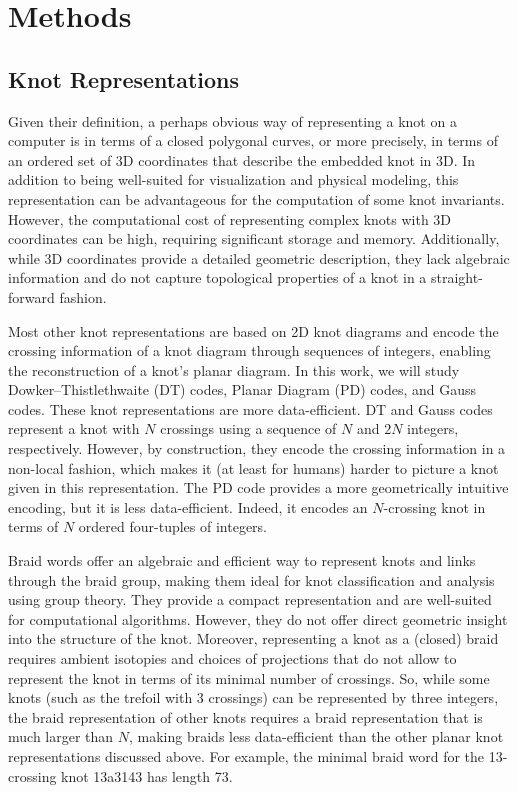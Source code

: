 \documentclass[11pt]{article}
\numberwithin{equation}{section}
\begin{document}
\section{Methods}
\label{sec:Methods}

\subsection{Knot Representations}
\label{sec:Representations}
Given their definition, a perhaps obvious way of representing a knot on a computer is in terms of a closed polygonal curves, or more precisely, in terms of an ordered set of 3D coordinates that describe the embedded knot in 3D. In addition to being well-suited for visualization and physical modeling, this representation can be advantageous for the computation of some knot invariants. However, the computational cost of representing complex knots with 3D coordinates can be high, requiring significant storage and memory. Additionally, while 3D coordinates provide a detailed geometric description, they lack algebraic information and do not capture topological properties of a knot in a straight-forward fashion.

Most other knot representations are based on 2D knot diagrams and encode the crossing information of a knot diagram through sequences of integers, enabling the reconstruction of a knot's planar diagram. In this work, we will study Dowker–Thistlethwaite (DT) codes, Planar Diagram (PD) codes, and Gauss codes. These knot representations are more data-efficient. DT and Gauss codes represent a knot with $N$ crossings using a sequence of $N$ and $2N$ integers, respectively. However, by construction, they encode the crossing information in a non-local fashion, which makes it (at least for humans) harder to picture a knot given in this representation. The PD code provides a more geometrically intuitive encoding, but it is less data-efficient. Indeed, it encodes an $N$-crossing knot in terms of $N$ ordered four-tuples of integers.

Braid words offer an algebraic and efficient way to represent knots and links through the braid group, making them ideal for knot classification and analysis using group theory. They provide a compact representation and are well-suited for computational algorithms. However, they do not offer direct geometric insight into the structure of the knot. Moreover, representing a knot as a (closed) braid requires ambient isotopies and choices of projections that do not allow to represent the knot in terms of its minimal number of crossings. So, while some knots (such as the trefoil with 3 crossings) can be represented by three integers, the braid representation of other knots requires a braid representation that is much larger than $N$, making braids less data-efficient than the other planar knot representations discussed above. For example, the minimal braid word for the 13-crossing knot 13a3143 has length 73. 
\end{document}
